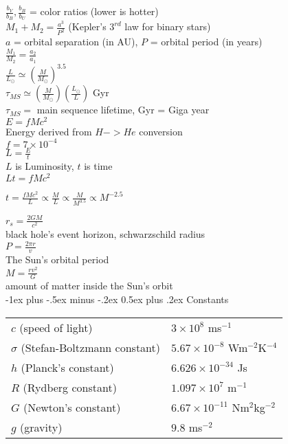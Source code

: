 \documentclass[10pt,landscape]{article}
\makeatletter
\renewcommand{\section}{\@startsection{section}{1}{0mm}%
                                {-1ex plus -.5ex minus -.2ex}%
                                {0.5ex plus .2ex}%
                                {\normalfont\large\bfseries}}
\makeatother
\begin{document}
\begin{multicols}{3}
$\frac{b_V}{b_B},\frac{b_B}{b_U}$ = color ratios (lower is hotter)\\

$M_1 + M_2 = \frac{a^3}{P^2}$ (Kepler’s $3^{rd}$ law for binary stars)\\
$a$ = orbital separation (in AU), $P$ = orbital period (in years)\\

$\frac{M_1}{M_2} = \frac{a_2}{a_1}$\\

$\frac{L}{L_\odot} \simeq \left( \frac{M}{M_\odot} \right)^{3.5}$\\

$\tau_{MS} \simeq \left( \frac{M}{M_\odot} \right) \left( \frac{L_\odot}{L} \right)$ Gyr\\
$\tau_{MS} = $ main sequence lifetime, Gyr = Giga year\\

$E = fMc^2$\\
Energy derived from $H->He$ conversion\\
$f = 7 \times 10^{-4}$\\

$L = \frac{E}{t}$\\
$L$ is Luminosity, $t$ is time\\

$Lt = fMc^2$

$t = \frac{fMc^2}{L} \propto \frac{M}{L} \propto \frac{M}{M^{3.5}} \propto M^{-2.5}$

$r_s = \frac{2GM}{c^2}$\\
black hole's event horizon, schwarzschild radius\\

$P=  \frac{2\pi r}{v}$\\
The Sun’s orbital period\\

$M = \frac{rv^2}{G}$\\
amount of matter inside the Sun’s orbit\\
\section{Constants}

\begin{tabular}{@{}ll@{}}
$c$ (speed of light)    &   $3 \times 10^8$ ms$^{-1}$ \\
$\sigma$ (Stefan-Boltzmann constant)   &    $5.67 \times 10^{-8}$ Wm$^{-2}$K$^{-4}$ \\
$h$ (Planck’s constant) &   $6.626 \times 10^{-34}$ Js\\
$R$ (Rydberg constant)  &   $1.097 \times 10^{7}$ m$^{-1}$\\
$G$ (Newton’s constant)  &   $6.67 \times 10^{-11}$ Nm$^{2}$kg$^{-2}$\\
$g$ (gravity)   &   $9.8$ ms$^{-2}$
\end{tabular}


\end{multicols}
\end{document}
